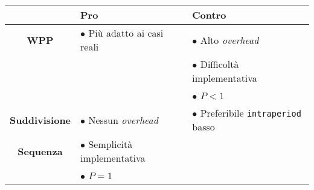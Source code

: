 \begin{table}[H]
  \centering
  \begin{tabular}{|c|l|l|}
    \hline
    
    & 
    \textbf{Pro} & 
    \textbf{Contro} \\
    
    \hline
    \hline
    \hline
    
    \textbf{WPP} &
    $\bullet$ Più adatto ai casi reali &
    $\bullet$ Alto \emph{overhead} \\
    
    &
    &
    $\bullet$ Difficoltà implementativa \\
    
    &
    &
    $\bullet$ $P < 1$ \\
    
    \hline
    
    \textbf{Suddivisione} &
     
    $\bullet$ Nessun \emph{overhead} &
    $\bullet$ Preferibile \verb|intraperiod| basso \\
    \textbf{Sequenza} 
    &
    $\bullet$ Semplicità implementativa &
    \\
    
    &
    $\bullet$ $P = 1$ &
    \\
    
    \hline
  \end{tabular}
\end{table}

